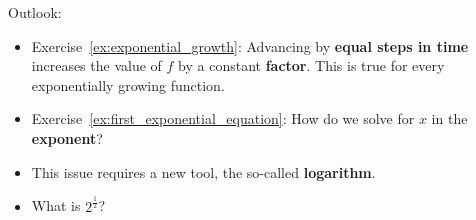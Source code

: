 \begin{tcolorbox}
	Outlook:
	\begin{itemize}
		\item Exercise~\ref{ex:exponential_growth}: Advancing by \textbf{equal steps in time} increases the value of $f$ by a constant \textbf{factor}.
		This is true for every exponentially growing function.
		\item Exercise~\ref{ex:first_exponential_equation}: How do we solve for $x$ in the \textbf{exponent}?
		\item This issue requires a new tool, the so-called \textbf{logarithm}.
		\item What is $2^{\frac{1}{2}}$?
	\end{itemize}
\end{tcolorbox}
